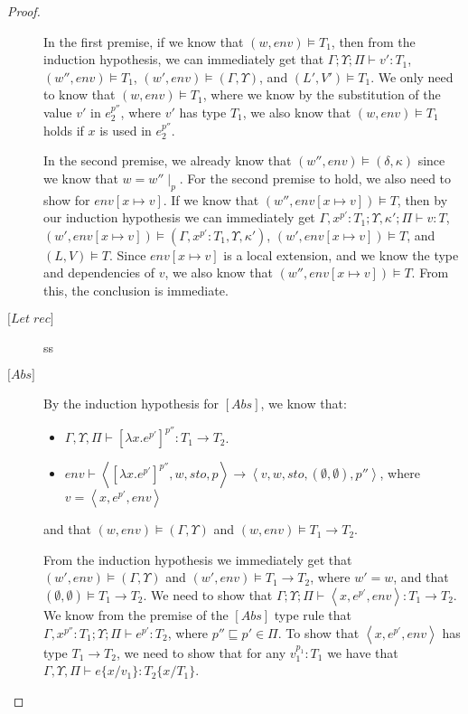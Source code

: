 \documentclass[../../master.tex]{subfiles}
\begin{document}
\begin{proof}
\begin{description}
			In the first premise, if we know that $(w,env)\models T_1$, then from the induction hypothesis, we can immediately get that $\Gamma;\Upsilon;\Pi\vdash v':T_1$, $(w'',env)\models T_1$, $(w',env)\models(\Gamma,\Upsilon)$, and $(L',V')\models T_1$.
			We only need to know that $(w,env)\models T_1$, where we know by the substitution of the value $v'$ in $e_2^{p''}$, where $v'$ has type $T_1$, we also know that $(w,env)\models T_1$ holds if $x$ is used in $e_2^{p''}$.


			In the second premise, we already know that $(w'',env)\models(\delta,\kappa)$ since we know that $w=w''\mid_p$.
			For the second premise to hold, we also need to show for $env[x\mapsto v]$.
			If we know that $(w'',env[x\mapsto v])\models T$, then by our induction hypothesis we can immediately get $\Gamma,x^{p'}:T_1;\Upsilon,\kappa';\Pi\vdash v:T$, $(w',env[x\mapsto v])\models(\Gamma,x^{p'}:T_1,\Upsilon,\kappa')$, $(w',env[x\mapsto v])\models T$, and $(L,V)\models T$.
			Since $env[x\mapsto v]$ is a local extension, and we know the type and dependencies of $v$, we also know that $(w'',env[x\mapsto v])\models T$.
			From this, the conclusion is immediate.
			
		\item[$\lbrack Let \; rec \rbrack$] ss
		\item[$\lbrack Abs \rbrack$] By the induction hypothesis for $[Abs]$, we know that:
			\begin{itemize}
				\item $\Gamma,\Upsilon,\Pi\vdash [\lambda x.e^{p'}]^{p''}:T_1\rightarrow T_2$.
				\item $env\vdash\left\langle [\lambda x.e^{p'}]^{p''},w,sto,p\right\rangle\rightarrow\left\langle v,w,sto,(\emptyset,\emptyset),p''\right\rangle$, where $v=\left\langle x, e^{p'}, env \right\rangle$
			\end{itemize}
			and that $(w,env)\models(\Gamma,\Upsilon)$ and $(w,env)\models T_1\rightarrow T_2$.

			From the induction hypothesis we immediately get that $(w',env)\models(\Gamma,\Upsilon)$ and $(w',env)\models T_1\rightarrow T_2$, where $w'=w$, and that $(\emptyset,\emptyset)\models T_1\rightarrow T_2$.
			We need to show that $\Gamma;\Upsilon;\Pi\vdash \left\langle x, e^{p'}, env \right\rangle:T_1\rightarrow T_2$.
			We know from the premise of the $[Abs]$ type rule that $\Gamma,x^{p''}:T_1;\Upsilon;\Pi\vdash e^{p'}:T_2$, where $p''\sqsubseteq p'\in\Pi$.
			To show that $\left\langle x, e^{p'}, env \right\rangle$ has type $T_1\rightarrow T_2$, we need to show that for any $v_1^{p_1}:T_1$ we have that $\Gamma,\Upsilon,\Pi\vdash e\{x/v_1\} : T_2\{x/T_1\}$.


\end{description}
\end{proof}
\end{document}
